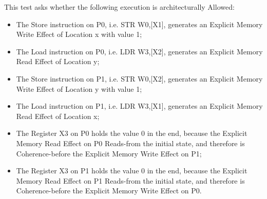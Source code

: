 This test asks whether the following execution is architecturally Allowed:

\begin{itemize}
  \item The Store instruction on P0, i.e. STR W0,[X1], generates an Explicit Memory Write Effect of Location x with value 1;
  \item The Load instruction on P0, i.e. LDR W3,[X2], generates an Explicit Memory Read Effect of Location y;
  \item The Store instruction on P1, i.e. STR W0,[X2], generates an Explicit Memory Write Effect of Location y with value 1;
  \item The Load instruction on P1, i.e. LDR W3,[X1], generates an Explicit Memory Read Effect of Location x;
  \item The Register X3 on P0 holds the value 0 in the end, because the Explicit Memory Read Effect on P0 Reads-from the initial state, and therefore is Coherence-before the Explicit Memory Write Effect on P1;
  \item The Register X3 on P1 holds the value 0 in the end, because the Explicit Memory Read Effect on P1 Reads-from the initial state, and therefore is Coherence-before the Explicit Memory Write Effect on P0.
\end{itemize}
